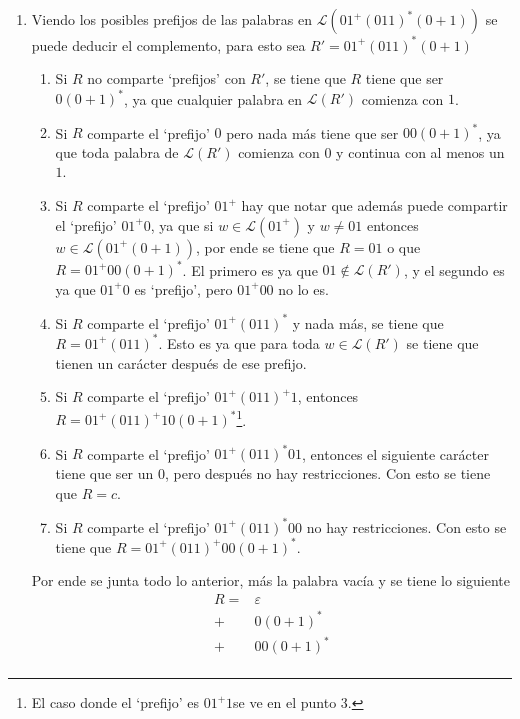 \documentclass{homework}
\begin{document}
\begin{p1}
    \begin{sol}
        \begin{enumerate}
            \item Viendo los posibles prefijos de las palabras en \(\mathcal{L}(01^+(011)^*(0+1))\) se puede deducir el complemento, para esto sea \(R'=01^+(011)^*(0+1)\)
            \begin{enumerate}[label=\arabic*)]
                \item Si \(R\) no comparte `prefijos' con \(R'\), se tiene que \(R\) tiene que ser \(0(0+1)^*\), ya que cualquier palabra en \(\mathcal{L}(R')\) comienza con \(1\).
                \item Si \(R\) comparte el `prefijo' \(0\) pero nada más tiene que ser \(00(0+1)^*\), ya que toda palabra de \(\mathcal{L}(R')\) comienza con \(0\) y continua con al menos un \(1\).
                \item Si \(R\) comparte el `prefijo' \(01^+\) hay que notar que además puede compartir el `prefijo' \(01^+0\), ya que si \(w\in\mathcal{L}(01^+)\) y \(w\neq01\) entonces \(w\in\mathcal{L}(01^+(0+1))\), por ende se tiene que \(R=01\) o que \(R=01^+00(0+1)^*\). El primero es ya que \(01\notin\mathcal{L}(R')\), y el segundo es ya que \(01^+0\) es `prefijo', pero \(01^+00\) no lo es.
                \item Si \(R\) comparte el `prefijo' \(01^+(011)^*\) y nada más, se tiene que \(R=01^+(011)^*\). Esto es ya que para toda \(w\in\mathcal{L}(R')\) se tiene que tienen un carácter después de ese prefijo.
                \item Si \(R\) comparte el `prefijo' \(01^+(011)^+1\), entonces \(R=01^+(011)^+10(0+1)^*\)\footnote{El caso donde el `prefijo' es \(01^+1\)se ve en el punto 3.}.
                \item Si \(R\) comparte el `prefijo' \(01^+(011)^*01\), entonces el siguiente carácter tiene que ser un \(0\), pero después no hay restricciones. Con esto se tiene que \(R=c\).
                \item Si \(R\) comparte el `prefijo' \(01^+(011)^*00\) no hay restricciones. Con esto se tiene que \(R=01^+(011)^+00(0+1)^*\).
            \end{enumerate}
            Por ende se junta todo  lo anterior, más la palabra vacía y se tiene lo siguiente
            \begin{align*}
                R=&\varepsilon\\
                +&0(0+1)^*\\
                +&00(0+1)^*\\

\end{align*}
\end{enumerate}
\end{sol}
\end{p1}
\end{document}

